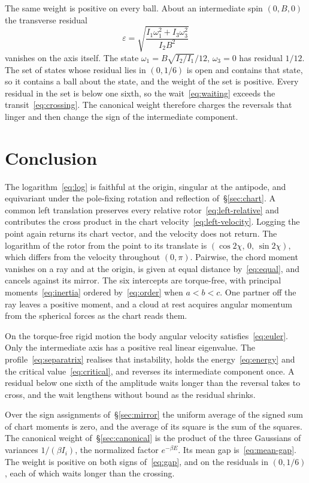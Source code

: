 \documentclass[a4paper]{article}
\begin{document}
The same weight is positive on every ball. About an intermediate spin \((0,B,0)\) the transverse residual
\[
\varepsilon=\sqrt{\frac{I_1\omega_1^2+I_3\omega_3^2}{I_2 B^2}}
\]
vanishes on the axis itself. The state \(\omega_1=B\sqrt{I_2/I_1}/12\), \(\omega_3=0\) has residual \(1/12\). The set of states whose residual lies in \((0,1/6)\) is open and contains that state, so it contains a ball about the state, and the weight of the set is positive. Every residual in the set is below one sixth, so the wait~\eqref{eq:waiting} exceeds the transit~\eqref{eq:crossing}. The canonical weight therefore charges the reversals that linger and then change the sign of the intermediate component.

\section{Conclusion}

The logarithm~\eqref{eq:log} is faithful at the origin, singular at the antipode, and equivariant under the pole-fixing rotation and reflection of~\S\ref{sec:chart}. A common left translation preserves every relative rotor~\eqref{eq:left-relative} and contributes the cross product in the chart velocity~\eqref{eq:left-velocity}. Logging the point again returns its chart vector, and the velocity does not return. The logarithm of the rotor from the point to its translate is \((\cos 2\chi,\,0,\,\sin 2\chi)\), which differs from the velocity throughout \((0,\pi)\). Pairwise, the chord moment vanishes on a ray and at the origin, is given at equal distance by~\eqref{eq:equal}, and cancels against its mirror. The six intercepts are torque-free, with principal moments~\eqref{eq:inertia} ordered by~\eqref{eq:order} when \(a<b<c\). One partner off the ray leaves a positive moment, and a cloud at rest acquires angular momentum from the spherical forces as the chart reads them.

On the torque-free rigid motion the body angular velocity satisfies~\eqref{eq:euler}. Only the intermediate axis has a positive real linear eigenvalue. The profile~\eqref{eq:separatrix} realises that instability, holds the energy~\eqref{eq:energy} and the critical value~\eqref{eq:critical}, and reverses its intermediate component once. A residual below one sixth of the amplitude waits longer than the reversal takes to cross, and the wait lengthens without bound as the residual shrinks.

Over the sign assignments of~\S\ref{sec:mirror} the uniform average of the signed sum of chart moments is zero, and the average of its square is the sum of the squares. The canonical weight of~\S\ref{sec:canonical} is the product of the three Gaussians of variances \(1/(\beta I_i)\), the normalized factor \(e^{-\beta E}\). Its mean gap is~\eqref{eq:mean-gap}. The weight is positive on both signs of~\eqref{eq:gap}, and on the residuals in \((0,1/6)\), each of which waits longer than the crossing.
\end{document}
